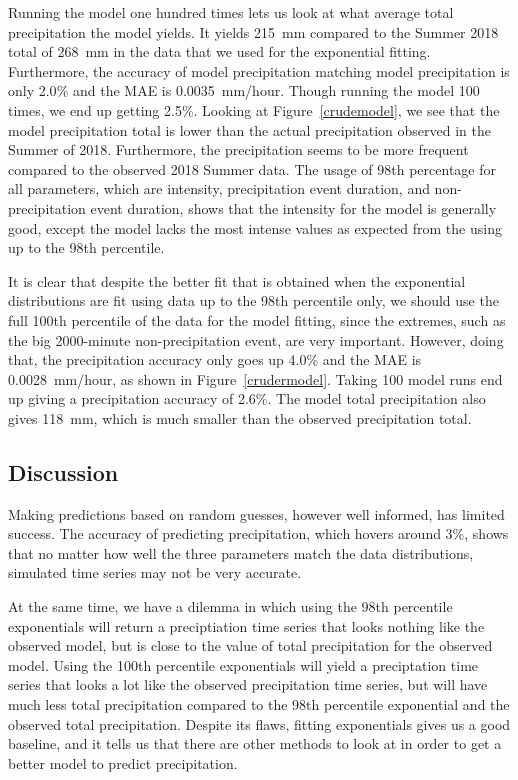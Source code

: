 \documentclass[11pt]{report}
\begin{document}
Running the model one hundred times lets us look at what average total
precipitation the model yields. It yields 215~mm compared to the Summer 2018
total of 268~mm in the data that we used for the exponential
fitting. Furthermore, the accuracy of model precipitation matching model
precipitation is only 2.0$\%$ and the MAE is 0.0035~mm/hour. Though running the model 100 times, we end up getting 2.5\%. Looking at Figure~\ref{crudemodel}, we see that the model precipitation total is lower than the actual precipitation observed in the Summer of 2018. Furthermore, the precipitation seems to be more frequent compared to the observed 2018 Summer data. The usage of 98th percentage for all parameters, which are intensity, precipitation event
duration, and non-precipitation event duration, shows that the intensity for
the model is generally good, except the model lacks the most intense values
as expected from the using up to the 98th percentile.

It is clear that despite the better fit that is obtained when the
exponential distributions are fit using data up to the 98th percentile only,
we should use the full 100th percentile of the data for the model fitting,
since the extremes, such as the big 2000-minute non-precipitation event, are
very important. However, doing that, the precipitation accuracy only goes up 4.0\% and the MAE is 0.0028~mm/hour, as shown in Figure~\ref{crudermodel}. Taking 100 model runs end up giving a precipitation accuracy of 2.6\%. The model total precipitation also gives 118~mm, which is much smaller than the observed precipitation total. 


\subsection{Discussion}\label{sec:spc_d}

Making predictions based on random guesses, however well informed, has
limited success. The accuracy of predicting precipitation, which hovers
around 3\%, shows that no matter how well the three parameters match the
data distributions, simulated time series may not be very accurate.

At the same time, we have a dilemma in which using the 98th percentile
exponentials will return a preciptiation time series that looks nothing like
the observed model, but is close to the value of total precipitation for the
observed model. Using the 100th percentile exponentials will yield a
preciptation time series that looks a lot like the observed precipitation
time series, but will have much less total precipitation compared to the
98th percentile exponential and the observed total precipitation. Despite its flaws, fitting exponentials gives us a good baseline, and it
tells us that there are other methods to look at in order to get a better
model to predict precipitation.
\end{document}
